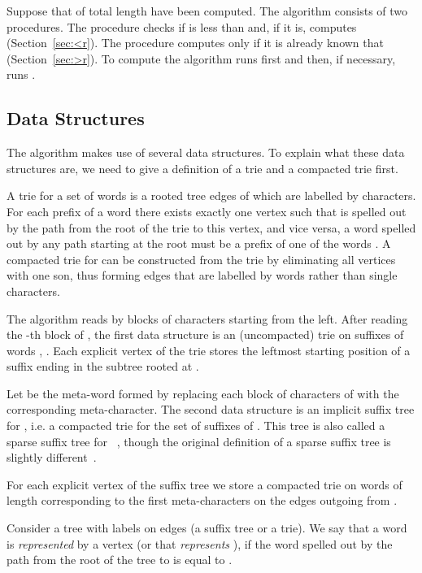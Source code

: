 \documentclass[10pt]{llncs}
\begin{document}
Suppose that  of total length  have been computed. The algorithm consists of two procedures. The procedure  checks if  is less than  and, if it is, computes  (Section~\ref{sec:<r}). The procedure  computes  only if it is already known that  (Section~\ref{sec:>r}). To compute  the algorithm runs  first and then, if necessary, runs .

\subsection{Data Structures}
The algorithm makes use of several data structures. To explain what these data structures are, we need to give a definition of a trie and a compacted trie first.

\begin{definition}
A trie for a set of words  is a rooted tree edges of which are labelled by characters. For each prefix  of a word  there exists exactly one vertex such that  is spelled out by the path from the root of the trie to this vertex, and vice versa, a word spelled out by any path starting at the root must be a prefix of one of the words . A compacted trie for  can be constructed from the trie by eliminating all vertices with one son, thus forming edges that are labelled by words rather than single characters.
\end{definition}

The algorithm reads  by blocks of  characters starting from the left. After reading the -th block of , the first data structure is an (uncompacted) trie on suffixes of words , . Each explicit vertex  of the trie stores the leftmost starting position of a suffix ending in the subtree rooted at .

Let  be the meta-word formed by replacing each block of characters of  with the corresponding meta-character. The second data structure is an implicit suffix tree for , i.e. a compacted trie for the set of suffixes of . This tree is also called a sparse suffix tree for ~\cite{ChienHonShahVitterDCC08,HonShahThanVitterSPIRE09,ChiuHonShahVitterDCC10}, though the original definition of a sparse suffix tree is slightly different~\cite{KU-96}. 

For each explicit vertex  of the suffix tree we store a compacted trie  on words of length  corresponding to the first meta-characters on the edges outgoing from .

\begin{definition}
   Consider a tree with labels on edges (a suffix tree or a trie). We say that a word  is \emph{represented} by a vertex  (or that  \emph{represents} ), if the word spelled out by the path from the root of the tree to  is equal to .
\end{definition}
\end{document}
